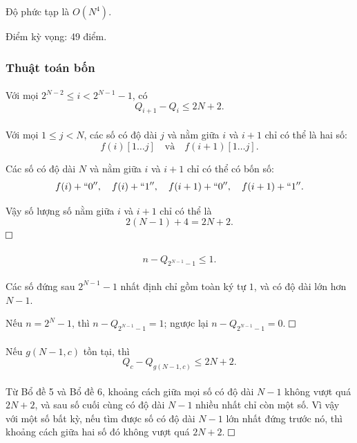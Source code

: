 \documentclass[11pt]{article}
\newcommand{\proofbox}{\ensuremath{\vcenter{\hrule height 0.45pt
  \hbox{\vrule width 0.45pt height 6pt\kern 6pt\vrule width 0.45pt}
  \hrule height 0.45pt}}}
\begin{document}
Độ phức tạp là \(O(N^4)\).

Điểm kỳ vọng: 49 điểm.

\subsubsection{Thuật toán bốn}

\paragraph{}
Với mọi \(2^{N-2}\le i<2^{N-1}-1\), có
\[
Q_{i+1}-Q_i\le 2N+2.
\]

\paragraph{}
Với mọi \(1\le j<N\), các số có độ dài \(j\) và nằm giữa \(i\) và \(i+1\) chỉ
có thể là hai số:
\[
f(i)[1\ldots j]\quad\text{và}\quad f(i+1)[1\ldots j].
\]

Các số có độ dài \(N\) và nằm giữa \(i\) và \(i+1\) chỉ có thể có bốn số:
\[
f(i)+``0'',\quad f(i)+``1'',\quad f(i+1)+``0'',\quad f(i+1)+``1''.
\]

Vậy số lượng số nằm giữa \(i\) và \(i+1\) chỉ có thể là
\[
2(N-1)+4=2N+2.
\]
\proofbox

\paragraph{}
\[
n-Q_{2^{N-1}-1}\le 1.
\]

\paragraph{}
Các số đứng sau \(2^{N-1}-1\) nhất định chỉ gồm toàn ký tự \(1\), và có độ dài
lớn hơn \(N-1\).

Nếu \(n=2^N-1\), thì \(n-Q_{2^{N-1}-1}=1\); ngược lại
\(n-Q_{2^{N-1}-1}=0\). \proofbox

\paragraph{}
Nếu \(g(N-1,c)\) tồn tại, thì
\[
Q_c-Q_{g(N-1,c)}\le 2N+2.
\]

\paragraph{}
Từ Bổ đề 5 và Bổ đề 6, khoảng cách giữa mọi số có độ dài \(N-1\) không vượt quá
\(2N+2\), và sau số cuối cùng có độ dài \(N-1\) nhiều nhất chỉ còn một số. Vì
vậy với một số bất kỳ, nếu tìm được số có độ dài \(N-1\) lớn nhất đứng trước
nó, thì khoảng cách giữa hai số đó không vượt quá \(2N+2\). \proofbox
\end{document}

